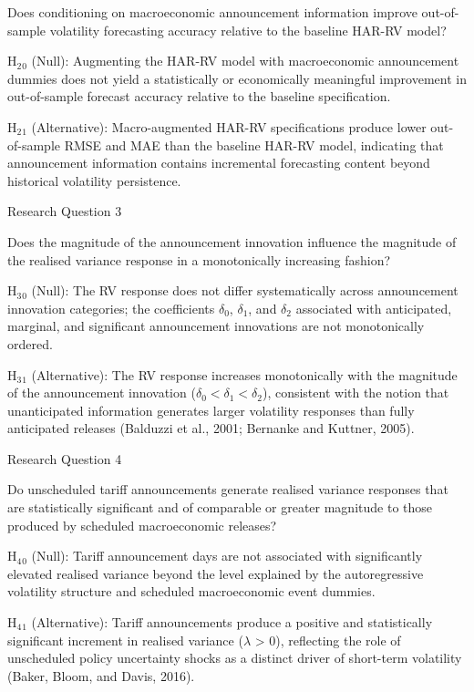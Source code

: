\documentclass[12pt,a4paper]{report}
\begin{document}
Does conditioning on macroeconomic announcement information improve out-of-sample volatility forecasting accuracy relative to the baseline HAR-RV model?

H$_{2}$$_{0}$ (Null): Augmenting the HAR-RV model with macroeconomic announcement dummies does not yield a statistically or economically meaningful improvement in out-of-sample forecast accuracy relative to the baseline specification.

H$_{2}$$_{1}$ (Alternative): Macro-augmented HAR-RV specifications produce lower out-of-sample RMSE and MAE than the baseline HAR-RV model, indicating that announcement information contains incremental forecasting content beyond historical volatility persistence.

Research Question 3

Does the magnitude of the announcement innovation influence the magnitude of the realised variance response in a monotonically increasing fashion?

H$_{3}$$_{0}$ (Null): The RV response does not differ systematically across announcement innovation categories; the coefficients $\delta_0$, $\delta_1$, and $\delta_2$ associated with anticipated, marginal, and significant announcement innovations are not monotonically ordered.

H$_{3}$$_{1}$ (Alternative): The RV response increases monotonically with the magnitude of the announcement innovation ($\delta_0 < \delta_1 < \delta_2$), consistent with the notion that unanticipated information generates larger volatility responses than fully anticipated releases (Balduzzi et al., 2001; Bernanke and Kuttner, 2005).

Research Question 4

Do unscheduled tariff announcements generate realised variance responses that are statistically significant and of comparable or greater magnitude to those produced by scheduled macroeconomic releases?

H$_{4}$$_{0}$ (Null): Tariff announcement days are not associated with significantly elevated realised variance beyond the level explained by the autoregressive volatility structure and scheduled macroeconomic event dummies.

H$_{4}$$_{1}$ (Alternative): Tariff announcements produce a positive and statistically significant increment in realised variance ($\lambda$ \textgreater{} 0), reflecting the role of unscheduled policy uncertainty shocks as a distinct driver of short-term volatility (Baker, Bloom, and Davis, 2016).
\end{document}
